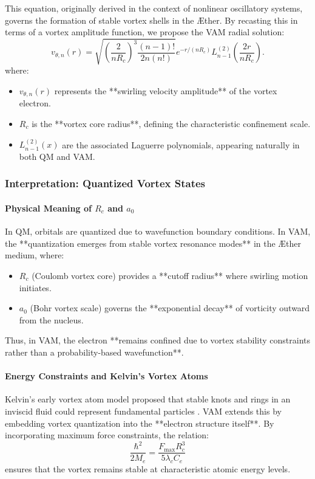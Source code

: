 This equation, originally derived in the context of nonlinear oscillatory systems, governs the formation of stable vortex shells in the Æther. By recasting this in terms of a vortex amplitude function, we propose the VAM radial solution:
\begin{equation}
    v_{\theta, n}(r) = \sqrt{\left(\frac{2}{n R_c}\right)^3 \frac{(n-1)!}{2n(n!)}} e^{-r / (n R_c)} L_{n-1}^{(2)}\left(\frac{2r}{n R_c}\right).
\end{equation}
where:
\begin{itemize}
    \item \( v_{\theta, n}(r) \) represents the **swirling velocity amplitude** of the vortex electron.
    \item \( R_c \) is the **vortex core radius**, defining the characteristic confinement scale.
    \item \( L_{n-1}^{(2)}(x) \) are the associated Laguerre polynomials, appearing naturally in both QM and VAM.
\end{itemize}

\subsubsection{Interpretation: Quantized Vortex States}

\paragraph*{Physical Meaning of \( R_c \) and \( a_0 \)}
In QM, orbitals are quantized due to wavefunction boundary conditions. In VAM, the **quantization emerges from stable vortex resonance modes** in the Æther medium, where:
\begin{itemize}
    \item \( R_c \) (Coulomb vortex core) provides a **cutoff radius** where swirling motion initiates.
    \item \( a_0 \) (Bohr vortex scale) governs the **exponential decay** of vorticity outward from the nucleus.
\end{itemize}
Thus, in VAM, the electron **remains confined due to vortex stability constraints rather than a probability-based wavefunction**.

\paragraph*{Energy Constraints and Kelvin's Vortex Atoms}
Kelvin's early vortex atom model proposed that stable knots and rings in an inviscid fluid could represent fundamental particles \cite{kelvin1867}. VAM extends this by embedding vortex quantization into the **electron structure itself**. By incorporating maximum force constraints, the relation:
\begin{equation}
    \frac{\hbar^2}{2M_e} = \frac{F_{\text{max}} R_c^3}{5 \lambda_c C_e}
\end{equation}
ensures that the vortex remains stable at characteristic atomic energy levels.

